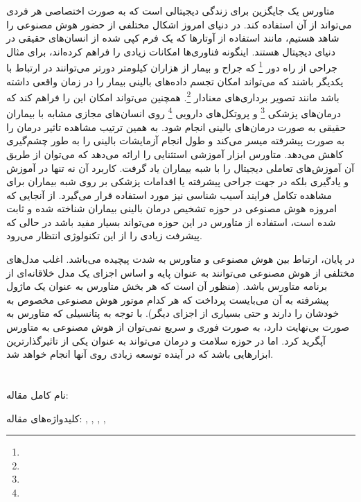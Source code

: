 \documentclass[10pt, a4paper]{article}
\begin{document}
متاورس یک جایگزین برای زندگی دیجیتالی است که به صورت اختصاصی هر فردی می‌تواند از
آن استفاده کند. در دنیای امروز اشکال مختلفی از حضور هوش مصنوعی را شاهد هستیم،
مانند استفاده از آوتار‌ها که یک فرم کپی شده از انسان‌های حقیقی در دنیای دیجیتال
هستند. اینگونه فناوری‌ها امکانات زیادی را فراهم کرده‌اند، برای مثال جراحی از راه
دور \footnote{} که جراح و بیمار از هزاران کیلومتر دورتر
می‌توانند در ارتباط با یکدیگر باشند که می‌تواند امکان تجسم داده‌های بالینی بیمار
را در زمان واقعی داشته باشد مانند تصویر برداری‌های معنادار
\footnote{}.  همچنین می‌تواند امکان این را فراهم کند که
درمان‌های پزشکی \footnote{} و پروتکل‌های دارویی
\footnote{} روی انسان‌های مجازی مشابه با بیماران حقیقی به
صورت درمان‌های بالینی انجام شود. به همین ترتیب مشاهده تاثیر درمان‌ را به صورت
پیشرفته میسر می‌کند و طول انجام آزمایشات بالینی را به طور چشم‌گیری کاهش می‌دهد.
متاورس ابزار آموزشی استثنایی را ارائه می‌دهد که می‌توان از طریق آن آموزش‌های
تعاملی دیجیتال را با شبه بیماران یاد گرفت. کاربرد آن نه تنها در آموزش و یادگیری
بلکه در جهت جراحی پیشرفته یا اقدامات پزشکی بر روی شبه بیماران برای مشاهده تکامل
فرایند آسیب شناسی نیز مورد استفاده قرار می‌گیرد. از آنجایی که امروزه هوش مصنوعی
در حوزه تشخیص درمان بالینی بیماران شناخته شده و ثابت شده است، استفاده از متاورس
در این حوزه می‌تواند بسیار مفید باشد در حالی که پیشرفت زیادی را از این تکنولوژی
انتظار می‌رود.

در پایان، ارتباط بین هوش مصنوعی و متاورس به شدت پیچیده می‌باشد. اغلب مدل‌های
مختلفی از هوش مصنوعی می‌توانند به عنوان پایه و اساس اجزای یک مدل خلاقانه‌ای از
برنامه متاورس باشد. (منظور آن است که هر بخش متاورس به عنوان یک ماژول پیشرفته به
آن می‌بایست پرداخت که هر کدام موتور هوش مصنوعی مخصوص به خودشان را دارند و حتی
بسیاری از اجزای دیگر). با توجه به پتانسیلی که متاورس به صورت بی‌نهایت دارد، به
صورت فوری و سریع نمی‌توان از هوش مصنوعی به متاورس آپگرید کرد. اما در حوزه سلامت
و درمان می‌تواند به عنوان یکی از تاثیرگذارترین ابزار‌هایی باشد که در آینده توسعه
زیادی روی آنها انجام خواهد شد.

\newpage

\section{}

نام کامل مقاله: 

کلیدواژه‌های مقاله: 
,
,
,
,
\end{document}
